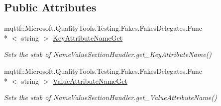 \subsection*{Public Attributes}
\begin{DoxyCompactItemize}
\item 
mqttf\-::\-Microsoft.\-Quality\-Tools.\-Testing.\-Fakes.\-Fakes\-Delegates.\-Func\\*
$<$ string $>$ \hyperlink{class_system_1_1_configuration_1_1_fakes_1_1_stub_name_value_section_handler_aabda82245bb775a2da4950c01dea511c}{Key\-Attribute\-Name\-Get}
\begin{DoxyCompactList}\small\item\em Sets the stub of Name\-Value\-Section\-Handler.\-get\-\_\-\-Key\-Attribute\-Name()\end{DoxyCompactList}\item 
mqttf\-::\-Microsoft.\-Quality\-Tools.\-Testing.\-Fakes.\-Fakes\-Delegates.\-Func\\*
$<$ string $>$ \hyperlink{class_system_1_1_configuration_1_1_fakes_1_1_stub_name_value_section_handler_acf80fdc2b6222a4dd1943a22a470782f}{Value\-Attribute\-Name\-Get}
\begin{DoxyCompactList}\small\item\em Sets the stub of Name\-Value\-Section\-Handler.\-get\-\_\-\-Value\-Attribute\-Name()\end{DoxyCompactList}\end{DoxyCompactItemize}
